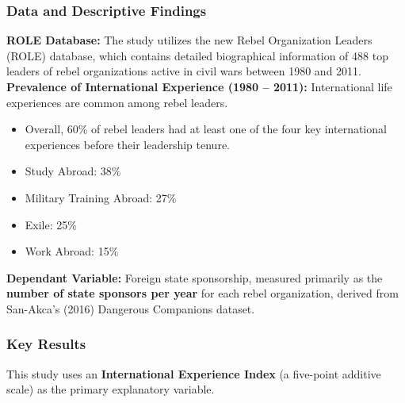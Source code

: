 \documentclass{article}
\begin{document}
    \subsubsection{Data and Descriptive Findings}

    \noindent \textbf{ROLE Database:} The study utilizes the new Rebel
Organization Leaders (ROLE) database, which contains detailed biographical
information of 488 top leaders of rebel organizations active in civil wars
between 1980 and 2011.\\

    \noindent \textbf{Prevalence of International Experience (1980 -- 2011):}
International life experiences are common among rebel leaders.
    \begin{itemize}
        \item Overall, 60\% of rebel leaders had at least one of the four key
        international experiences before their leadership tenure.
        \item Study Abroad: 38\%
        \item Military Training Abroad: 27\%
        \item Exile: 25\%
        \item Work Abroad: 15\%
    \end{itemize}

    \noindent \textbf{Dependant Variable:} Foreign state sponsorship,
measured primarily as the \textbf{number of state sponsors per year} for
each rebel organization, derived from San-Akca's (2016) Dangerous Companions
dataset.

    \subsubsection{Key Results}

    \noindent This study uses an
\textbf{International Experience Index} (a five-point additive scale) as the
primary explanatory variable.
\end{document}
